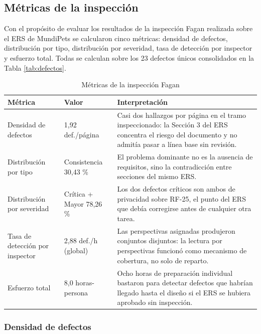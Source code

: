 \documentclass[journal,onecolumn]{IEEEtran}
\begin{document}
	\subsection{Métricas de la inspección}
	
	Con el propósito de evaluar los resultados de la inspección Fagan realizada sobre el ERS de
	MundiPets se calcularon cinco métricas: densidad de defectos, distribución por tipo, distribución
	por severidad, tasa de detección por inspector y esfuerzo total. Todas se calculan sobre los 23
	defectos únicos consolidados en la Tabla \ref{tab:defectos}.
	
	\begin{table}[H]
		\centering
		\caption{Métricas de la inspección Fagan}
		\label{tab:metricas}
		\begin{tabular}{L{3.8cm} C{2.6cm} L{6.4cm}}
			\toprule
			\textbf{Métrica} & \textbf{Valor} & \textbf{Interpretación} \\
			\midrule
			Densidad de defectos & 1,92 def./página &
			Casi dos hallazgos por página en el tramo inspeccionado: la Sección 3 del ERS concentra
			el riesgo del documento y no admitía pasar a línea base sin revisión. \\
			\addlinespace
			Distribución por tipo & Consistencia 30,43 \% &
			El problema dominante no es la ausencia de requisitos, sino la contradicción entre
			secciones del mismo ERS. \\
			\addlinespace
			Distribución por severidad & Crítica + Mayor 78,26 \% &
			Los dos defectos críticos son ambos de privacidad sobre RF-25, el punto del ERS que
			debía corregirse antes de cualquier otra tarea. \\
			\addlinespace
			Tasa de detección por inspector & 2,88 def./h (global) &
			Las perspectivas asignadas produjeron conjuntos disjuntos: la lectura por perspectivas
			funcionó como mecanismo de cobertura, no solo de reparto. \\
			\addlinespace
			Esfuerzo total & 8,0 horas-persona &
			Ocho horas de preparación individual bastaron para detectar defectos que habrían llegado
			hasta el diseño si el ERS se hubiera aprobado sin inspección. \\
			\bottomrule
		\end{tabular}
	\end{table}
	
	\subsubsection{Densidad de defectos}
	
\end{document}

